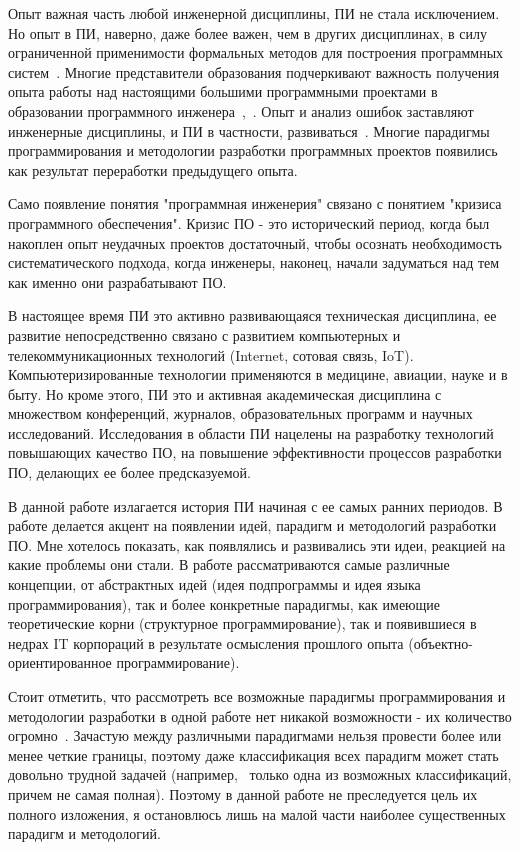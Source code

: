 Опыт важная часть любой инженерной дисциплины, ПИ не стала исключением. Но опыт в ПИ, наверно, даже более важен, чем в других дисциплинах, в силу ограниченной применимости формальных методов для построения программных систем~\cite{McConnell}. Многие представители образования подчеркивают важность получения опыта работы над настоящими большими программными проектами в образовании программного инженера~\cite{Wohlin},~\cite{Kurkovsky}. Опыт и анализ ошибок заставляют инженерные дисциплины, и ПИ в частности, развиваться~\cite{Jackson:2008:ASE}. Многие парадигмы программирования и методологии разработки программных проектов появились как результат переработки предыдущего опыта.

Само появление понятия "программная инженерия" связано с понятием "кризиса программного обеспечения". Кризис ПО - это исторический период, когда был накоплен опыт неудачных проектов достаточный, чтобы осознать необходимость систематического подхода, когда инженеры, наконец, начали задуматься над тем как именно они разрабатывают ПО.

В настоящее время ПИ это активно развивающаяся техническая дисциплина, ее развитие непосредственно связано с развитием компьютерных и телекоммуникационных технологий (Internet, сотовая связь, IoT). Компьютеризированные технологии применяются в медицине, авиации, науке и в быту. Но кроме этого, ПИ это и активная академическая дисциплина с множеством конференций, журналов, образовательных программ и научных исследований. Исследования в области ПИ нацелены на разработку технологий повышающих качество ПО, на повышение эффективности процессов разработки ПО, делающих ее более предсказуемой.

В данной работе излагается история ПИ начиная с ее самых ранних периодов. В работе делается акцент на появлении идей, парадигм и методологий разработки ПО. Мне хотелось показать, как появлялись и развивались эти идеи, реакцией на какие проблемы они стали. В работе рассматриваются самые различные концепции, от абстрактных идей (идея подпрограммы и идея языка программирования), так и более конкретные парадигмы, как имеющие теоретические корни (структурное программирование), так и появившиеся в недрах IT корпораций в результате осмысления прошлого опыта (объектно-ориентированное программирование).

Стоит отметить, что рассмотреть все возможные парадигмы программирования и методологии разработки в одной работе нет никакой возможности - их количество огромно~\cite{PARADIGMS}. Зачастую между различными парадигмами нельзя провести более или менее четкие границы, поэтому даже классификация всех парадигм может стать довольно трудной задачей (например,~\cite{Roy:TPPP} только одна из возможных классификаций, причем не самая полная). Поэтому в данной работе не преследуется цель их полного изложения, я остановлюсь лишь на малой части наиболее существенных парадигм и методологий.

